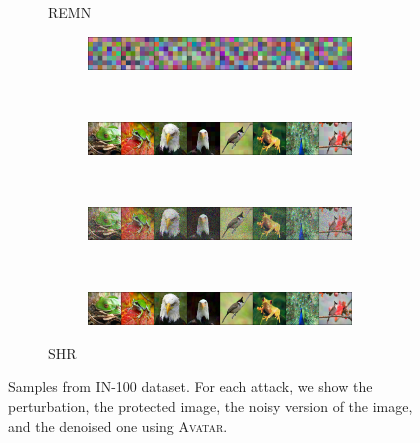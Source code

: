 \documentclass[conference]{IEEEtran}
\theoremstyle{definition}
\theoremstyle{remark}
\theoremstyle{proposition}
\begin{document}
\begin{figure}[htp!]
\begin{subfigure}{.90\textwidth}
	\caption{REMN~\citep{fu2022remn}}
    \vspace{2em}
    \end{subfigure}
    \begin{subfigure}{.90\textwidth}
        \hspace{0.95em}
    	\begin{subfigure}{.90\textwidth}
    		\centering
    		\includegraphics[width=1.0\textwidth, valign=c]{samples/ImageNet-SHR/pert_adv.png}
    	\end{subfigure}\\
        \hspace{0.75em}
    	\begin{subfigure}{.90\textwidth}
    		\centering
    		\includegraphics[width=1.0\textwidth, valign=c]{samples/ImageNet-SHR/original_input.png}
    	\end{subfigure}\\
        \hspace{0.75em}
    	\begin{subfigure}{.90\textwidth}
    		\centering
    		\includegraphics[width=1.0\textwidth, valign=c]{samples/ImageNet-SHR/init_0.png}
    	\end{subfigure}\\
        \hspace{0.95em}
    	\begin{subfigure}{.90\textwidth}
    		\centering
    		\includegraphics[width=1.0\textwidth, valign=c]{samples/ImageNet-SHR/samples_0.png}
    	\end{subfigure}
	\caption{SHR~\citep{yu2022shr}}
    \end{subfigure}
    \caption{Samples from IN-100 dataset. For each attack, we show the perturbation, the protected image, the noisy version of the image, and the denoised one using \textsc{Avatar}.}
	\label{fig:IN_samples_III}
\end{figure}
\end{document}
